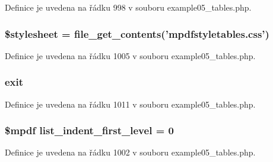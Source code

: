 Definice je uvedena na řádku 998 v souboru example05\-\_\-tables.\-php.

\hypertarget{example05__tables_8php_a19e5cf73e817c55a49205e6ec78c88a8}{
\subsubsection[{\$stylesheet}]{\setlength{\rightskip}{0pt plus 5cm}\$stylesheet = file\-\_\-get\-\_\-contents('mpdfstyletables.\-css')}}\label{example05__tables_8php_a19e5cf73e817c55a49205e6ec78c88a8}


Definice je uvedena na řádku 1005 v souboru example05\-\_\-tables.\-php.

\hypertarget{example05__tables_8php_a6733eb5f605d09eaede9845835d71c4e}{
\subsubsection[{exit}]{\setlength{\rightskip}{0pt plus 5cm}exit}}\label{example05__tables_8php_a6733eb5f605d09eaede9845835d71c4e}


Definice je uvedena na řádku 1011 v souboru example05\-\_\-tables.\-php.

\hypertarget{example05__tables_8php_a8780612514d14375709d0685d189579e}{
\subsubsection[{list\-\_\-indent\-\_\-first\-\_\-level}]{\setlength{\rightskip}{0pt plus 5cm}\$mpdf list\-\_\-indent\-\_\-first\-\_\-level = 0}}\label{example05__tables_8php_a8780612514d14375709d0685d189579e}


Definice je uvedena na řádku 1002 v souboru example05\-\_\-tables.\-php.

